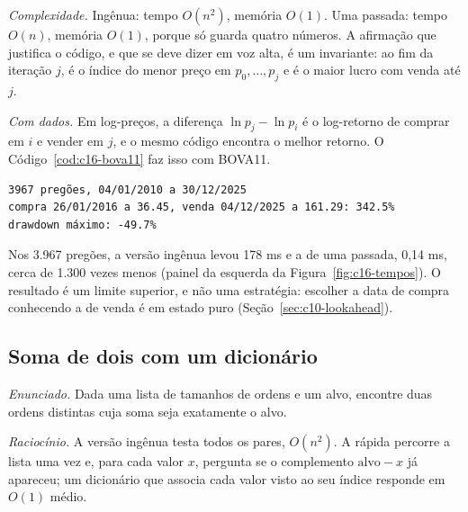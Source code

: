 

\emph{Complexidade.} Ingênua: tempo $O(n^2)$, memória $O(1)$. Uma passada: tempo $O(n)$, memória $O(1)$, porque só guarda quatro números. A afirmação que justifica o código, e que se deve dizer em voz alta, é um invariante: ao fim da iteração $j$,  é o índice do menor preço em $p_0, \dots, p_j$ e  é o maior lucro com venda até $j$.

\emph{Com dados.} Em log-preços, a diferença $\ln p_j - \ln p_i$ é o log-retorno de comprar em $i$ e vender em $j$, e o mesmo código encontra o melhor retorno. O Código~\ref{cod:c16-bova11} faz isso com BOVA11.


\begin{lstlisting}[style=saida]
3967 pregões, 04/01/2010 a 30/12/2025
compra 26/01/2016 a 36.45, venda 04/12/2025 a 161.29: 342.5%
drawdown máximo: -49.7%
\end{lstlisting}

Nos 3.967 pregões, a versão ingênua levou 178 ms e a de uma passada, 0,14 ms, cerca de 1.300 vezes menos (painel da esquerda da Figura~\ref{fig:c16-tempos}). O resultado é um limite superior, e não uma estratégia: escolher a data de compra conhecendo a de venda é  em estado puro (Seção~\ref{sec:c10-lookahead}).

\subsection{Soma de dois com um dicionário}

\emph{Enunciado.} Dada uma lista de tamanhos de ordens e um alvo, encontre duas ordens distintas cuja soma seja exatamente o alvo.

\emph{Raciocínio.} A versão ingênua testa todos os pares, $O(n^2)$. A rápida percorre a lista uma vez e, para cada valor $x$, pergunta se o complemento $\text{alvo} - x$ já apareceu; um dicionário que associa cada valor visto ao seu índice responde em $O(1)$ médio.



